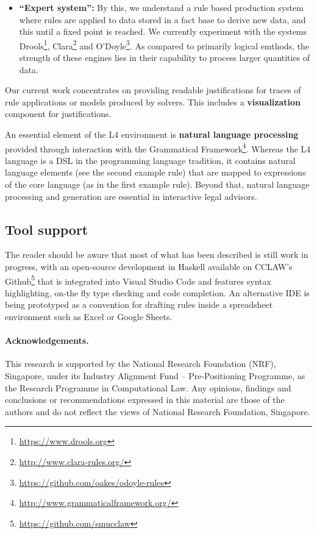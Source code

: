 \documentclass[runningheads]{llncs}
\begin{document}
\begin{itemize}
\item \textbf{``Expert system'':} By this, we understand a rule based
  production system where rules are applied to data stored in a fact base to
  derive new data, and this until a fixed point is reached. We currently
  experiment with the systems Drools\footnote{\url{https://www.drools.org}},
  Clara\footnote{\url{http://www.clara-rules.org/}} and
  O'Doyle\footnote{\url{https://github.com/oakes/odoyle-rules}}. As compared
  to primarily logical emthods, the strength
  of these engines lies in their capability to process larger quantities of
  data.
\end{itemize}
Our current work concentrates on providing readable justifications for traces
of rule applications or models produced by solvers. This includes a \textbf{visualization} component for justifications. 

An essential element of the L4 environment is \textbf{natural language processing} provided through interaction with the Grammatical Framework\footnote{\url{http://www.grammaticalframework.org/}}. Whereas the L4 language is a DSL in the programming language tradition, it contains natural language elements (see the second example rule) that are mapped to expressions of the core language (as in the first example rule). Beyond that, natural language processing and generation are essential in interactive legal advisors.

\subsection{Tool support}\label{sec:tool_support}

The reader should be aware that most of what has been described is still work
in progress, with an open-source development in
Haskell available on CCLAW's Github\footnote{\url{https://github.com/smucclaw}} that is integrated into
Visual Studio Code and features syntax highlighting, on-the fly type checking
and code completion. An alternative IDE is being prototyped as a convention for
drafting rules inside a spreadsheet environment such as Excel or Google Sheets.

\paragraph{Acknowledgements.}
This research is supported by the National Research Foundation (NRF),
Singapore, under its Industry Alignment Fund -- Pre-Positioning Programme, as
the Research Programme in Computational Law. Any opinions, findings and
conclusions or recommendations expressed in this material are those of the
authors and do not reflect the views of National Research Foundation,
Singapore.

% 
% 


\end{document}
